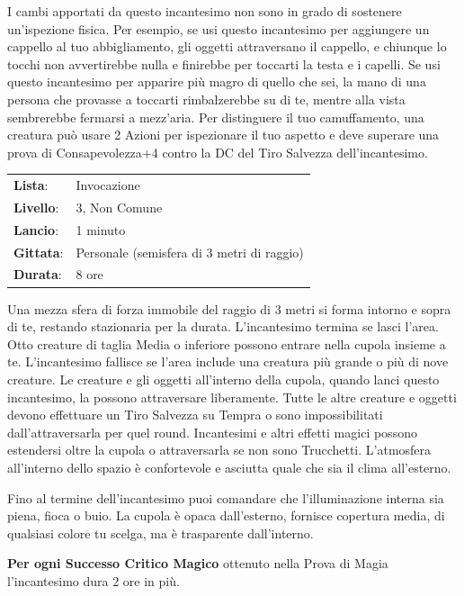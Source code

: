 \begin{multicols}{2}
I cambi apportati da questo incantesimo non sono in grado di sostenere un'ispezione fisica. Per esempio, se usi questo incantesimo per aggiungere un cappello al tuo abbigliamento, gli oggetti attraversano il cappello, e chiunque lo tocchi non avvertirebbe nulla e finirebbe per toccarti la testa e i capelli. Se usi questo incantesimo per apparire più magro di quello che sei, la mano di una persona che provasse a toccarti rimbalzerebbe su di te, mentre alla vista sembrerebbe fermarsi a mezz'aria. Per distinguere il tuo camuffamento, una creatura può usare 2 Azioni per ispezionare il tuo aspetto e deve superare una prova di Consapevolezza+4 contro la DC del Tiro Salvezza dell'incantesimo.

\noindent\begin{tabularx}{\linewidth}{p{1.3cm}X}
	\rowcolor{gray!20}\textbf{Lista}: & Invocazione \\
	\textbf{Livello}: & 3, Non Comune \\
	\rowcolor{gray!20}\textbf{Lancio}: & 1 minuto \\
	\textbf{Gittata}: & Personale (semisfera di 3 metri di raggio) \\
	\rowcolor{gray!20}\textbf{Durata}: & 8 ore \\
\end{tabularx}\smallskip

Una mezza sfera di forza immobile del raggio di 3 metri si forma intorno e sopra di te, restando stazionaria per la durata. L'incantesimo termina se lasci l'area. Otto creature di taglia Media o inferiore possono entrare nella cupola insieme a te. L'incantesimo fallisce se l'area include una creatura più grande o più di nove creature. Le creature e gli oggetti all'interno della cupola, quando lanci questo incantesimo, la possono attraversare liberamente. Tutte le altre creature e oggetti devono effettuare un Tiro Salvezza su Tempra o sono impossibilitati dall'attraversarla per quel round. Incantesimi e altri effetti magici possono estendersi oltre la cupola o attraversarla se non sono Trucchetti. L'atmosfera all'interno dello spazio è confortevole e asciutta quale che sia il clima all'esterno.

Fino al termine dell'incantesimo puoi comandare che l'illuminazione interna sia piena, fioca o buio. La cupola è opaca dall'esterno, fornisce copertura media, di qualsiasi colore tu scelga, ma è trasparente dall'interno.

\textbf{Per ogni Successo Critico Magico} ottenuto nella Prova di Magia l'incantesimo dura 2 ore in più.


\end{multicols}
